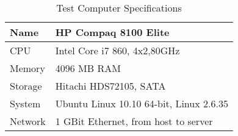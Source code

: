 \begin{table}
  \centering
  \caption{Test Computer Specifications}
  \begin{tabular}{ | l | l |}
    \hline
    Name    & HP Compaq 8100 Elite                \\ \hline
    CPU     & Intel Core i7 860, 4x2,80GHz        \\ \hline
    Memory  & 4096 MB \ac{RAM}                   \\ \hline
    Storage & Hitachi HDS72105, SATA          \\ \hline
    System  & Ubuntu Linux 10.10 64-bit, Linux 2.6.35 \\ \hline
    Network  & 1 GBit Ethernet, from host to server \\ \hline
  \end{tabular}
  \label{tbl:device:computer}
\end{table}
